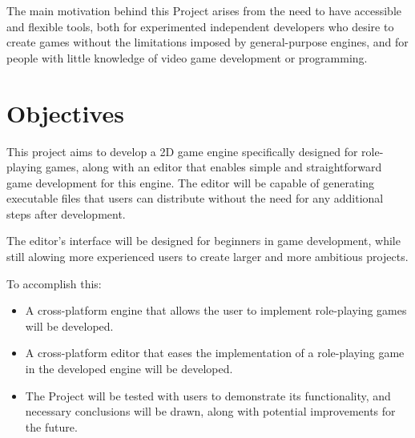 \medskip

The main motivation behind this Project arises from the need to have accessible and flexible tools, both for experimented independent developers who desire to create games without the limitations imposed by general-purpose engines, and for people with little knowledge of video game development or programming.

\section*{Objectives}
This project aims to develop a 2D game engine specifically designed for role-playing games, along with an editor that enables simple and straightforward game development for this engine. The editor will be capable of generating executable files that users can distribute without the need for any additional steps after development.

\smallskip

The editor's interface will be designed for beginners in game development, while still alowing more experienced users to create larger and more ambitious projects.

\medskip

To accomplish this:
\begin{itemize}
	\item A cross-platform engine that allows the user to implement role-playing games will be developed.
	\item A cross-platform editor that eases the implementation of a role-playing game in the developed engine will be developed.
	\item The Project will be tested with users to demonstrate its functionality, and necessary conclusions will be drawn, along with potential improvements for the future.
\end{itemize}

